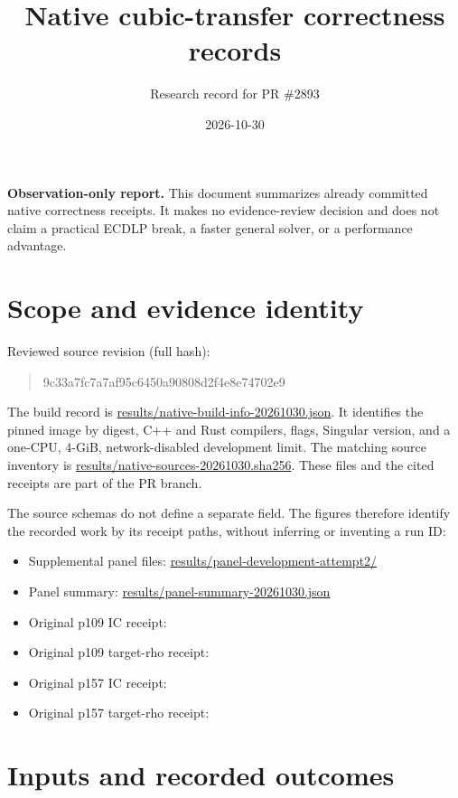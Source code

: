 \documentclass[10pt]{article}
\title{Native cubic-transfer correctness records}
\author{Research record for PR \#2893}
\date{2026-10-30}
\begin{document}
\maketitle

\textbf{Observation-only report.} This document summarizes already committed
native correctness receipts. It makes no evidence-review decision and does not
claim a practical ECDLP break, a faster general solver, or a performance
advantage.

\section*{Scope and evidence identity}

Reviewed source revision (full hash):
\begin{quote}\small\ttfamily
9c33a7fc7a7af95c6450a90808d2f4e8e74702e9
\end{quote}
The build record is \url{results/native-build-info-20261030.json}. It identifies
the pinned image by digest, C++ and Rust compilers, flags, Singular version,
and a one-CPU, 4-GiB, network-disabled development limit. The matching source
inventory is \url{results/native-sources-20261030.sha256}. These files and the
cited receipts are part of the PR branch.

The source schemas do not define a separate  field. The figures
therefore identify the recorded work by its receipt paths, without inferring
or inventing a run ID:
\begin{itemize}
\item Supplemental panel files: \url{results/panel-development-attempt2/}
\item Panel summary: \url{results/panel-summary-20261030.json}
\item Original p109 IC receipt:
\allowbreak{}\allowbreak{}
\item Original p109 target-rho receipt:
\allowbreak{}\allowbreak{}
\item Original p157 IC receipt:
\allowbreak{}\allowbreak{}
\item Original p157 target-rho receipt:
\allowbreak{}\allowbreak{}
\end{itemize}

\section*{Inputs and recorded outcomes}
\end{document}

